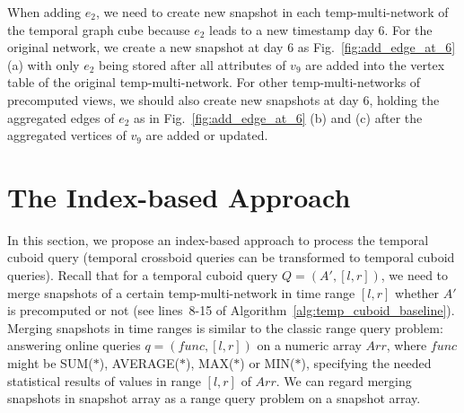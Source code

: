 \documentclass[10pt,journal,compsoc]{IEEEtran}
\begin{document}
{\begin{example}
	When adding $ e_2 $, we need to create new snapshot in each temp-multi-network of the temporal graph cube because $ e_2 $ leads to a new timestamp day 6. For the original network, we create a new snapshot at day 6 as Fig.~\ref{fig:add_edge_at_6} (a) with only $ e_2 $ being stored after all attributes of $ v_9 $ are added into the vertex table of the original temp-multi-network. For other temp-multi-networks of precomputed views, we should also create new snapshots at day 6, holding the aggregated edges of $ e_2 $ as in Fig.~\ref{fig:add_edge_at_6} (b) and (c) after the aggregated vertices of $ v_9 $ are added or updated.
\end{example}
}

\section{The Index-based Approach}\label{sec:indexes}
In this section, we propose an index-based approach to process the temporal cuboid query (temporal crossboid queries can be transformed to temporal cuboid queries). Recall that for a temporal cuboid query $ Q=(A',[l,r]) $, we need to merge snapshots of a certain temp-multi-network in time range $ [l,r] $ whether $ A' $ is precomputed or not (see lines~8-15 of Algorithm~\ref{alg:temp_cuboid_baseline}). Merging snapshots in time ranges is similar to the classic range query problem: answering online queries $ q=(func,[l,r]) $ on a numeric array $ Arr $, where $ func $ might be SUM($\ast$), AVERAGE($\ast$), MAX($\ast$) or MIN($\ast$), specifying the needed statistical results of values in range $ [l,r] $ of $ Arr $. We can regard merging snapshots in snapshot array as a range query problem on a snapshot array.
\end{document}
